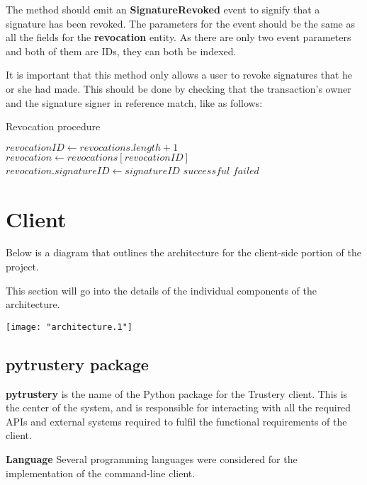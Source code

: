 \documentclass[12pt,a4paper]{report}
\begin{document}
	The method should emit an \textbf{SignatureRevoked} event to signify that a signature has been revoked. The parameters for the event should be the same as all the fields for the \textbf{revocation} entity. As there are only two event parameters and both of them are IDs, they can both be indexed.
	
	It is important that this method only allows a user to revoke signatures that he or she had made. This should be done by checking that the transaction's owner and the signature signer in reference match, like as follows:
	
	\begin{algorithm}
		\caption{Revocation procedure}
		\label{revocationprocedure}
		\begin{algorithmic}[0]
					\State $revocationID \gets revocations.length + 1$
					\State $revocation \gets revocations[revocationID]$
					\State $revocation.signatureID \gets signatureID$
					\State {}
					\State \Return $successful$
				\Else
					\State \Return $failed$
				\EndIf
			\EndProcedure
		\end{algorithmic}
	\end{algorithm}
	
	\section{Client}
	Below is a diagram that outlines the architecture for the client-side portion of the project.
	
	This section will go into the details of the individual components of the architecture.
	
	\begin{center}
  		\texttt{[image: "architecture.1"]}
	\end{center}
	
	\subsection{pytrustery package}
	\textbf{pytrustery} is the name of the Python package for the Trustery client. This is the center of the system, and is responsible for interacting with all the required APIs and external systems required to fulfil the functional requirements of the client.
	
	\bigskip
	\noindent \textbf{Language}\newline
	Several programming languages were considered for the implementation of the command-line client.
	
\end{document}

